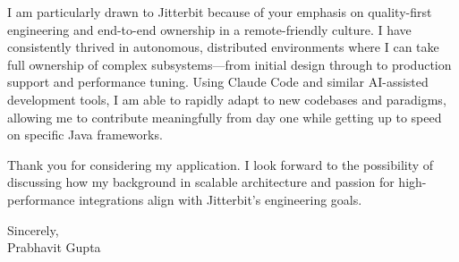 \documentclass[11pt,a4paper]{article}
\begin{document}
\vspace{1em}
\noindent
I am particularly drawn to Jitterbit because of your emphasis on quality-first engineering and end-to-end ownership in a remote-friendly culture. I have consistently thrived in autonomous, distributed environments where I can take full ownership of complex subsystems—from initial design through to production support and performance tuning. Using Claude Code and similar AI-assisted development tools, I am able to rapidly adapt to new codebases and paradigms, allowing me to contribute meaningfully from day one while getting up to speed on specific Java frameworks.

\vspace{1em}
\noindent
Thank you for considering my application. I look forward to the possibility of discussing how my background in scalable architecture and passion for high-performance integrations align with Jitterbit's engineering goals.

\vspace{1em}

\noindent
Sincerely,\\
Prabhavit Gupta
\end{document}
